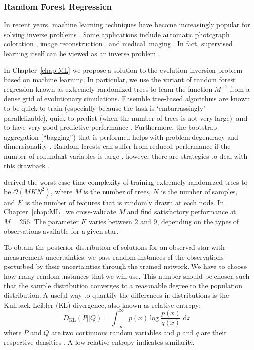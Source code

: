 \subsubsection*{Random Forest Regression} 
In recent years, machine learning techniques have become increasingly popular for solving inverse problems \citep[e.g.,][]{rosasco2005learning, fai2017inner, 2017InvPr..33l4007A}. 
Some applications include automatic photograph coloration \citep{larsson2016learning}, image reconstruction \citep[e.g.,][]{2017arXiv170300555S}, and medical imaging \citep[e.g.,][]{prato2008inverse, jin2017deep}. 
In fact, supervised learning itself can be viewed as an inverse problem \citep{vito2005learning}. 

In Chapter~\ref{chap:ML} we propose a solution to the evolution inversion problem based on machine learning. 
In particular, we use the variant of random forest regression \citep{breiman2001random} known as extremely randomized trees \citep{geurts2006extremely} to learn the function $M^{-1}$ from a dense grid of evolutionary simulations. 
Ensemble tree-based algorithms are known to be quick to train (especially because the task is `embarrassingly' parallelizable), quick to predict (when the number of trees is not very large), and to have very good predictive performance \citep[e.g.,][]{Caruana:2006:ECS:1143844.1143865}. %
Furthermore, the bootstrap aggregation (``bagging'') that is performed helps with problem degeneracy and dimensionality \citep[e.g.,][]{Skurichina2002}. 
Random forests can suffer from reduced performance if the number of redundant variables is large \citep{louppe2014understanding}, however there are strategies to deal with this drawback \citep{tuv2009feature}. 

\citet[][]{louppe2014understanding} derived the worst-case time complexity of training extremely randomized trees to be ${\mathcal{O}(MKN^2)}$, where $M$ is the number of trees, $N$ is the number of samples, and $K$ is the number of features that is randomly drawn at each node. 
In Chapter~\ref{chap:ML}, we cross-validate $M$ and find satisfactory performance at ${M=256}$. 
The parameter $K$ varies between $2$ and $9$, depending on the types of observations available for a given star. 





To obtain the posterior distribution of solutions for an observed star with measurement uncertainties, we pass random instances of the observations perturbed by their uncertainties through the trained network. 
We have to choose how many random instances that we will use. 
This number should be chosen such that the sample distribution converges to a reasonable degree to the population distribution. 
A useful way to quantify the differences in distributions is the Kullback-Leibler (KL) divergence, also known as relative entropy: 
\begin{equation} \label{eq:KL}
    D_{\text{KL}} (P||Q) = \int_{-\infty}^\infty p(x) \log \frac{p(x)}{q(x)} \;\text{d}x
\end{equation}
where $P$ and $Q$ are two continuous random variables and $p$ and $q$ are their respective densities \citep{10.2307/2236703}. 
A low relative entropy indicates similarity. %

